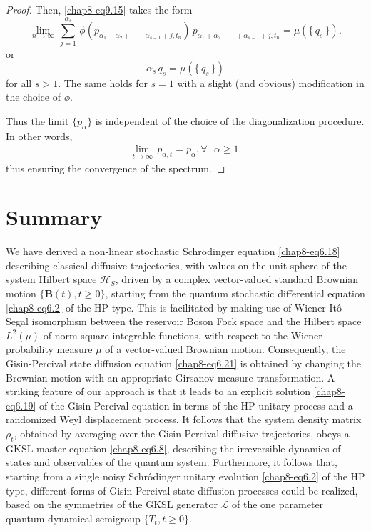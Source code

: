 \begin{proof}
Then, \eqref{chap8-eq9.15} takes the form 
\begin{equation}
	\underset{n\rightarrow\infty}{\lim}\, \sum_{j=1}^{\alpha_s}\, \phi(p_{\alpha_1+\alpha_2+\cdots +\alpha_{s-1}+j, t_n})\, p_{\alpha_1+\alpha_2+\cdots +\alpha_{s-1}+j, t_n}=\mu\left( \{\,q_s\,\} \right). \label{chap8-eq9.17}
\end{equation}
or 
$$
\alpha_s\, q_s=\mu\left( \{\,q_s\,\}\right)
$$
for all $s>1$. The same holds for $s=1$ with a slight (and obvious) modification in the choice of $\phi$. 

Thus the limit $\{p_\alpha\}$  is independent of  the choice of the  diagonalization procedure. In other words, 
\begin{eqnarray*} 
	\underset{t\rightarrow\infty}{\lim}\, p_{\alpha, t}=p_\alpha,  \forall \ \ \ \alpha\geq 1.
\end{eqnarray*}
thus ensuring the convergence of the spectrum.
\end{proof}

\section{Summary} \label{chap8-sec10}

We have derived a non-linear stochastic Schr{\"o}dinger equation \eqref{chap8-eq6.18} describing classical diffusive trajectories, with values on the unit sphere of the system Hilbert space $\mathcal{H}_S$, driven by a complex vector-valued standard Brownian motion $\{\mathbf{B}(t), t\geq 0\}$, starting from the quantum stochastic differential equation \eqref{chap8-eq6.2} of the HP type. This is facilitated by making use of  Wiener-It{\^o}-Segal isomorphism between the reservoir Boson Fock space and the Hilbert space $L^2(\mu)$ of norm square integrable functions, with respect to the Wiener probability measure $\mu$ of a vector-valued Brownian motion. Consequently, the Gisin-Percival state diffusion equation \eqref{chap8-eq6.21} is obtained by changing the Brownian motion with an appropriate Girsanov measure transformation. A striking feature of our approach is that it leads to an explicit solution \eqref{chap8-eq6.19} of the Gisin-Percival equation in terms of the HP unitary process and a randomized Weyl displacement process. It follows that the system density matrix $\rho_t$, obtained by averaging over the Gisin-Percival diffusive trajectories, obeys a GKSL master equation \eqref{chap8-eq6.8}, describing the irreversible dynamics of  states and  observables of the quantum system. Furthermore, it follows that, starting from a single noisy Schr{\^o}dinger unitary evolution \eqref{chap8-eq6.2} of the HP type, different forms of Gisin-Percival state diffusion processes could be realized, based on the symmetries of the GKSL generator $\mathcal{L}$ of the one parameter quantum dynamical semigroup $\{T_t, t\geq 0\}$.

